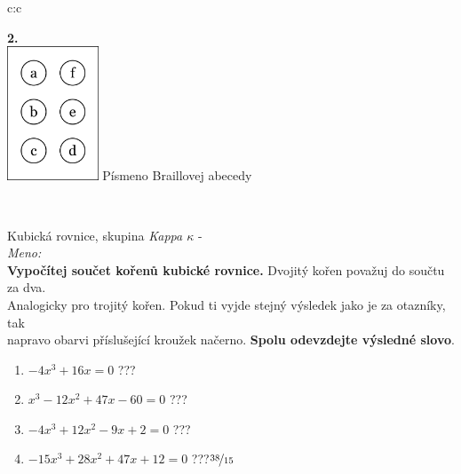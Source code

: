 \documentclass[10pt]{report}
\begin{document}
\begin{tabular}{c:c}
\begin{minipage}[c][99mm][t]{0.49\linewidth}
\begin{center}
\begin{minipage}{0.77\linewidth}
\begin{center}
\end{center}
\end{minipage}
\begin{minipage}{0.20\linewidth}
\begin{center}
{\Huge\bfseries 2.} \\[2mm]
\includegraphics[height=40mm]{../images/braille.png}
{\small Písmeno Braillovej abecedy}
\end{center}
\end{minipage}
\end{center}
\end{minipage}
\\ \hdashline
\begin{minipage}[c][99mm][t]{0.49\linewidth}
\begin{center}
\vspace{7mm}
{\huge Kubická rovnice, skupina \textit{Kappa $\kappa$} -}\\[4.5mm]
\textit{Meno:}\phantom{xxxxxxxxxxxxxxxxxxxxxxxxxxxxxxxxxxxxxxxxxxxxxxxxxxxxxxxxxxxxxxxxx}\\[3.5mm]
\textbf{Vypočítej součet kořenů kubické rovnice.} Dvojitý kořen považuj do součtu za dva.\\Analogicky pro trojitý kořen. Pokud ti vyjde stejný výsledek jako je za otazníky, tak\\napravo obarvi příslušející kroužek načerno. \textbf{Spolu odevzdejte výsledné slovo}.\\[3mm]
\begin{minipage}{0.77\linewidth}
\begin{center}
\begin{varwidth}{\textwidth}
\begin{enumerate}
\large
\item $-4x^3+16x=0$\quad \dotfill\; ???\;\dotfill {}
\item $x^3-12x^2+47x-60=0$\quad \dotfill\; ???\;\dotfill {}
\item $-4x^3+12x^2-9x+2=0$\quad \dotfill\; ???\;\dotfill {}
\item $-15x^3+28x^2+47x+12=0$\quad \dotfill\; ???\;\dotfill \quad $\nicefrac{38}{15}$

\end{enumerate}
\end{varwidth}
\end{center}
\end{minipage}
\end{center}
\end{minipage}
\end{tabular}
\end{document}
